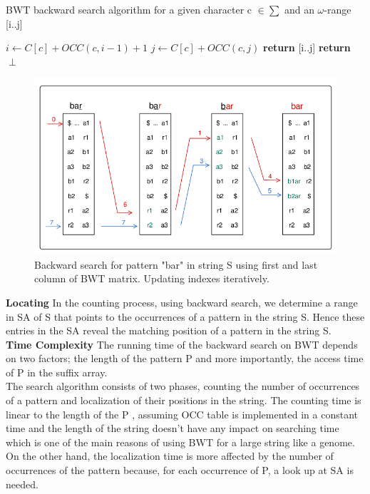 \documentclass[11pt,a4paper]{report}
\begin{document}
\begin{algorithm}[H]
   \caption{BWT backward search algorithm for a 
   given character c $\in \sum $ and an 
   $\omega$-range [i..j]}
   
    \begin{algorithmic}[1]
       	\State ${i \leftarrow C[c] + OCC(c, i-1)+1}$
        \State ${j \leftarrow C[c] + OCC(c,j)}$
        		\State \textbf{return} [i..j]
        	\Else
        		\State \textbf{return} $\perp$
        	\EndIf 
    \EndFunction

	\end{algorithmic}
  \label{backward search alg}	
\end{algorithm}




\begin{figure}[H]
\centering
\includegraphics[width=12cm]{pictures/bar_1.png}
\caption{Backward search for pattern "bar" in 
string S using first and 
last column of BWT matrix. Updating indexes 
iteratively.}
\label{backwardSearch}
\end{figure}

\textbf{Locating} \label{Locating}
In the counting process, using backward search, we determine
a range in SA of S that points to the occurrences of a pattern
in the string S. Hence these entries in the SA reveal the 
matching position of a pattern in the string S.\\

\textbf{Time Complexity} 
The running time of the backward search on BWT 
depends on two factors; the length of the 
pattern P and more importantly, the access 
time of P in the suffix array.\\
The search algorithm consists of two phases, 
counting the number of occurrences of a pattern 
and localization of their positions in the string.
The counting time is linear to the length of 
the P , assuming OCC table is implemented in a 
constant time and the length of the string doesn't 
have any impact on searching time which is one 
of the main reasons of using BWT for a large 
string like a genome. On the other hand, the 
localization time is more affected by the number 
of occurrences of the pattern  because, for 
each occurrence of P, a look up at SA is needed.
\end{document}
